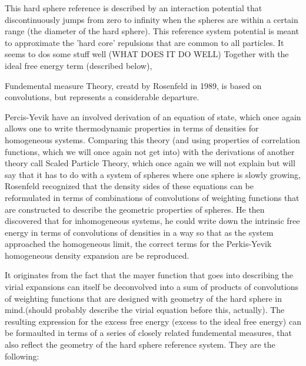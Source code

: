 This hard sphere reference is described by an interaction
potential that discontinuously jumps from zero to infinity when the
spheres are within a certain range (the diameter of the hard
sphere).  This reference system potential is meant to approximate
the 'hard core' repulsions that are common to all particles.  It
seems to dos some stuff well (WHAT DOES IT DO WELL) Together with
the ideal free energy term (described below),



Fundemental measure Theory, creatd by Rosenfeld in 1989, is based on
convolutions, but represents a considerable departure. 

Percis-Yevik have an involved derivation of an equation of state,
which once again allows one to write thermodynamic properties in terms
of densities for homogeneous systems.  Comparing this theory (and
using properties of correlation functions, which we will once again
not get into) with the derivations of another theory call Scaled
Particle Theory, which once again we will not explain but will say
that it has to do with a system of spheres where one sphere is slowly
growing, Rosenfeld recognized that the density sides of these
equations can be reformulated in terms of combinations of convolutions
of weighting functions that are constructed to describe the geometric
properties of spheres.  He then discovered that for inhomogeneous
systems, he could write down the intrinsic free energy in terms of
convolutions of densities in a way so that as the system approached
the homogeneous limit, the correct terms for the Perkis-Yevik
homogeneous density expansion are be reproduced.

 It originates
from the fact that the mayer function that goes into describing the
virial expansions can itself be deconvolved into a sum of products of
convolutions of weighting functions that are designed with geometry of
the hard sphere in mind.(should probably describe the virial equation
before this, actually).  The resulting expression for the excess free
energy (excess to the ideal free energy) can be formaulted in terms of
a series of closely related fundemental measures, that also reflect
the geometry of the hard sphere reference system.  They are the
following:

